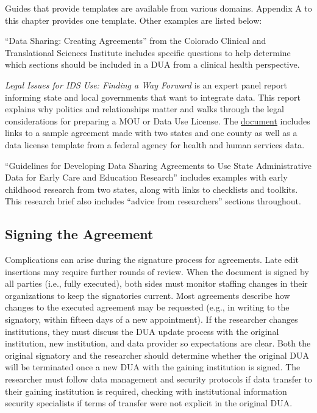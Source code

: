\documentclass[
]{book}
\begin{document}
Guides that provide templates are available from various domains. Appendix A to this chapter provides one template. Other examples are listed below:

``Data Sharing: Creating Agreements'' \citep{jarquin2012} from the Colorado Clinical and Translational Sciences Institute includes specific questions to help determine which sections should be included in a DUA from a clinical health perspective.

\emph{Legal Issues for IDS Use: Finding a Way Forward} \citep{petrila2017} is an expert panel report informing state and local governments that want to integrate data. This report explains why politics and relationships matter and walks through the legal considerations for preparing a MOU or Data Use License. The \href{https://1slo241vnt3j2dn45s1y90db-wpengine.netdna-ssl.com/wp-content/uploads/2016/07/Legal-Issues.pdf}{document} includes links to a sample agreement made with two states and one county as well as a data license template from a federal agency for health and human services data.

``Guidelines for Developing Data Sharing Agreements to Use State Administrative Data for Early Care and Education Research'' \citep{shaw2018} includes examples with early childhood research from two states, along with links to checklists and toolkits. This research brief also includes ``advice from researchers'' sections throughout.

\hypertarget{signing-the-agreement}{%
\subsection{Signing the Agreement}\label{signing-the-agreement}}

Complications can arise during the signature process for agreements. Late edit insertions may require further rounds of review. When the document is signed by all parties (i.e., fully executed), both sides must monitor staffing changes in their organizations to keep the signatories current. Most agreements describe how changes to the executed agreement may be requested (e.g., in writing to the signatory, within fifteen days of a new appointment). If the researcher changes institutions, they must discuss the DUA update process with the original institution, new institution, and data provider so expectations are clear. Both the original signatory and the researcher should determine whether the original DUA will be terminated once a new DUA with the gaining institution is signed. The researcher must follow data management and security protocols if data transfer to their gaining institution is required, checking with institutional information security specialists if terms of transfer were not explicit in the original DUA.
\end{document}
